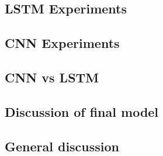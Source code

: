 \subsection{LSTM Experiments}


\subsection{CNN Experiments}


\subsection{CNN vs LSTM}


\subsection{Discussion of final model}
\subsection{General discussion}
